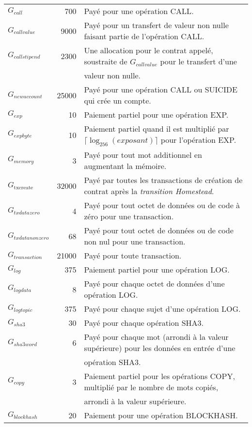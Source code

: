 \documentclass[9pt,oneside]{amsart}
\begin{document}
\begin{tabular*}{\columnwidth}[h]{lrl}
$G_{call}$ & 700 & Payé pour une opération {\small CALL}. \\
$G_{callvalue}$ & 9000 & Payé pour un transfert de valeur non nulle faisant partie de l'opération {\small CALL}. \\
$G_{callstipend}$ & 2300 & Une allocation pour le contrat appelé, soustraite de $G_{callvalue}$ pour le transfert d'une \\
 & & valeur non nulle. \\
$G_{newaccount}$ & 25000 & Payé pour une opération {\small CALL} ou {\small SUICIDE} qui crée un compte. \\
$G_{exp}$ & 10 & Paiement partiel pour une opération {\small EXP}. \\
$G_{expbyte}$ & 10 & Paiement partiel quand il est multiplié par $\lceil\log_{256}(exposant)\rceil$ pour l'opération {\small EXP}. \\
$G_{memory}$ & 3 & Payé pour tout mot additionnel en augmentant la mémoire. \\
$G_\text{txcreate}$ & 32000 & Payé par toutes les transactions de création de contrat après la {\it transition Homestead}.\\
$G_{txdatazero}$ & 4 & Payé pour tout octet de données ou de code à zéro pour une transaction. \\
$G_{txdatanonzero}$ & 68 & Payé pour tout octet de données ou de code non nul pour une transaction. \\
$G_{transaction}$ & 21000 & Payé pour toute transaction. \\
$G_{log}$ & 375 & Paiement partiel pour une opération {\small LOG}. \\
$G_{logdata}$ & 8 & Payé pour chaque octet de données d'une opération {\small LOG}. \\
$G_{logtopic}$ & 375 & Payé pour chaque sujet d'une opération {\small LOG}. \\
$G_{sha3}$ & 30 & Payé pour chaque opération {\small SHA3}. \\
$G_{sha3word}$ & 6 & Payé pour chaque mot (arrondi à la valeur supérieure) pour les données en entrée d'une \\
 & & opération {\small SHA3}. \\
$G_{copy}$ & 3 & Paiement partiel pour les opérations {\small *COPY}, multiplié par le nombre de mots copiés, \\
 & & arrondi à la valeur supérieure. \\
$G_{blockhash}$ & 20 & Paiement pour une opération {\small BLOCKHASH}. \\

\bottomrule
\end{tabular*}
\end{document}
